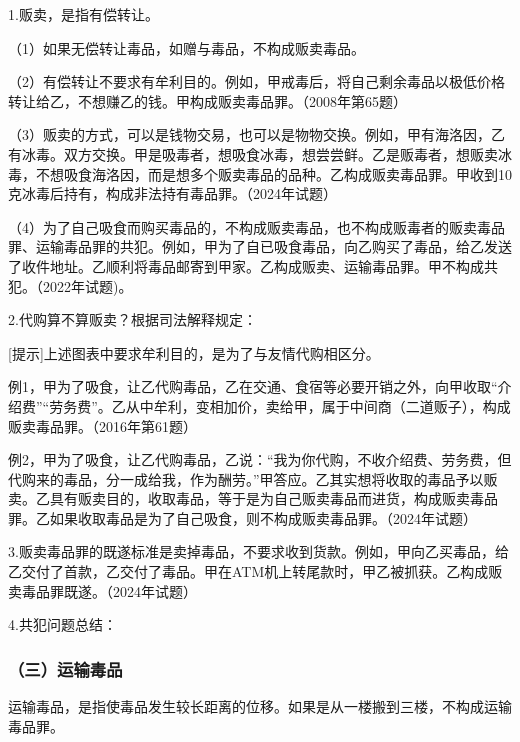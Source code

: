 1.贩卖，是指有偿转让。

（1）如果无偿转让毒品，如赠与毒品，不构成贩卖毒品。

（2）有偿转让不要求有牟利目的。例如，甲戒毒后，将自己剩余毒品以极低价格转让给乙，不想赚乙的钱。甲构成贩卖毒品罪。（2008年第65题）

（3）贩卖的方式，可以是钱物交易，也可以是物物交换。例如，甲有海洛因，乙有冰毒。双方交换。甲是吸毒者，想吸食冰毒，想尝尝鲜。乙是贩毒者，想贩卖冰毒，不想吸食海洛因，而是想多个贩卖毒品的品种。乙构成贩卖毒品罪。甲收到10克冰毒后持有，构成非法持有毒品罪。（2024年试题）

（4）为了自己吸食而购买毒品的，不构成贩卖毒品，也不构成贩毒者的贩卖毒品罪、运输毒品罪的共犯。例如，甲为了自已吸食毒品，向乙购买了毒品，给乙发送了收件地址。乙顺利将毒品邮寄到甲家。乙构成贩卖、运输毒品罪。甲不构成共犯。（2022年试题)。

2.代购算不算贩卖？根据司法解释规定：


[提示]上述图表中要求牟利目的，是为了与友情代购相区分。

例1，甲为了吸食，让乙代购毒品，乙在交通、食宿等必要开销之外，向甲收取“介绍费”“劳务费”。乙从中牟利，变相加价，卖给甲，属于中间商（二道贩子），构成贩卖毒品罪。（2016年第61题）

例2，甲为了吸食，让乙代购毒品，乙说：“我为你代购，不收介绍费、劳务费，但代购来的毒品，分一成给我，作为酬劳。”甲答应。乙其实想将收取的毒品予以贩卖。乙具有贩卖目的，收取毒品，等于是为自己贩卖毒品而进货，构成贩卖毒品罪。乙如果收取毒品是为了自己吸食，则不构成贩卖毒品罪。（2024年试题）

3.贩卖毒品罪的既遂标准是卖掉毒品，不要求收到货款。例如，甲向乙买毒品，给乙交付了首款，乙交付了毒品。甲在ATM机上转尾款时，甲乙被抓获。乙构成贩卖毒品罪既遂。（2024年试题）

4.共犯问题总结：



\subsubsection*{（三）运输毒品}

运输毒品，是指使毒品发生较长距离的位移。如果是从一楼搬到三楼，不构成运输毒品罪。

